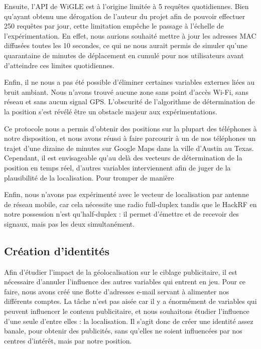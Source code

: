\documentclass[runningheads]{llncs}
\begin{document}
Ensuite, l'API de WiGLE est à l'origine limitée à 5 requêtes quotidiennes. Bien qu'ayant obtenu une dérogation de l'auteur du projet afin de pouvoir effectuer 250 requêtes par jour, cette limitation empêche le passage à l'échelle de l'expérimentation. En effet, nous aurions souhaité mettre à jour les adresses MAC diffusées toutes les 10 secondes, ce qui ne nous aurait permis de simuler qu'une quarantaine de minutes de déplacement en cumulé pour nos utilisateurs avant d'atteindre ces limites quotidiennes.

Enfin, il ne nous a pas été possible d'éliminer certaines variables externes liées au bruit ambiant. Nous n'avons trouvé aucune zone sans point d'accès Wi-Fi, sans réseau et sans aucun signal GPS. L'obscurité de l'algorithme de détermination de la position s'est révélé être un obstacle majeur aux expérimentations. 

Ce protocole nous a permis d'obtenir des positions sur la plupart des téléphones à notre disposition, et nous avons réussi à faire parcourir à un de nos téléphones un trajet d'une dizaine de minutes sur Google Maps dans la ville d'Austin au Texas. 
Cependant, il est envisageable qu'au delà des vecteurs de détermination de la position en temps réel, d'autres variables interviennent afin de juger de la plausibilité de la localisation. Pour tromper de manière

Enfin, nous n'avons pas expérimenté avec le vecteur de localisation par antenne de réseau mobile, car cela nécessite une radio full-duplex tandis que le HackRF en notre possession n'est qu'half-duplex : il permet d'émettre et de recevoir des signaux, mais pas les deux simultanément. 

\subsection{Création d'identités}

Afin d'étudier l'impact de la géolocalisation sur le ciblage publicitaire, il est nécessaire d'annuler l'influence des autres variables qui entrent en jeu. Pour ce faire, nous avons créé une flotte d'adresses e-mail servant à alimenter nos différents comptes. La tâche n'est pas aisée car il y a énormément de variables qui peuvent influencer le contenu publicitaire, et nous souhaitons étudier l'influence d'une seule d'entre elles : la localisation. Il s'agit donc de créer une identité assez banale, pour obtenir des publicités, sans qu'elles ne soient influencées par nos centres d'intérêt, mais par notre position.
\end{document}
